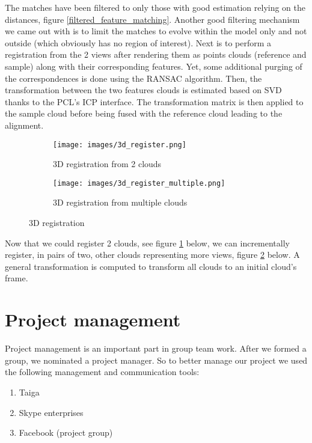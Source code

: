 \documentclass[a4paper]{report}
\begin{document}
The matches have been filtered to only those with good estimation relying on the distances, figure \ref{filtered_feature_matching}. Another good filtering mechanism we came out with is to limit the matches to evolve within the model only and not outside (which obviously has no region of interest).
Next is to perform a registration from the 2 views after rendering them as points clouds (reference and sample) along with their corresponding features. Yet, some additional purging of the correspondences is done using the RANSAC algorithm. Then, the transformation between the two features clouds is estimated based on SVD thanks to the PCL’s ICP interface. The transformation matrix is then applied to the sample cloud before being fused with the reference cloud leading to the alignment.
\begin{figure}[h]
\begin{subfigure}{0.5\textwidth}
\texttt{[image: images/3d\_register.png]}
\caption{3D registration from 2 clouds}
\label{3d_register}
\end{subfigure}
\begin{subfigure}{0.5\textwidth}
\texttt{[image: images/3d\_register\_multiple.png]}
\caption{3D registration from multiple clouds}
\label{3d_register_multiple}
\end{subfigure}
\caption{3D registration}
\label{feature_matching}
\end{figure}
Now that we could register 2 clouds, see figure \ref{3d_register} below, we can incrementally register, in pairs of two, other clouds representing more views, figure \ref{3d_register_multiple} below. A general transformation is computed to transform all clouds to an initial cloud’s frame.


\chapter{Project management}
Project management is an important part in group team work. After we formed a group, we nominated a project manager. So to better manage our project we used the following management and communication tools:
\begin{enumerate}
\item Taiga
\item Skype enterprises
\item Facebook (project group)
\end{enumerate}
\end{document}

